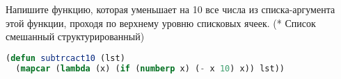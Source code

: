 Напишите функцию, которая уменьшает на 10 все числа из списка-аргумента этой
функции, проходя по верхнему уровню списковых ячеек. (* Список смешанный
структурированный)

\begin{lstlisting}[language=Lisp]
(defun subtrcact10 (lst)
  (mapcar (lambda (x) (if (numberp x) (- x 10) x)) lst))
\end{lstlisting}

